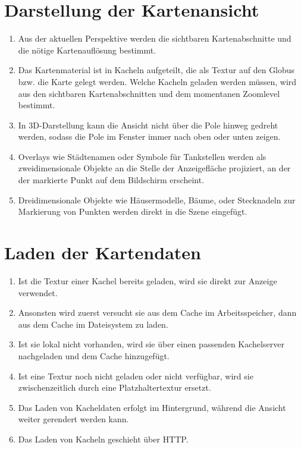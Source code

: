 \documentclass[10pt]{scrreprt}
\begin{document}
\section{Darstellung der Kartenansicht}
\begin{enumerate}[leftmargin=2cm]
\item Aus der aktuellen Perspektive werden die sichtbaren Kartenabschnitte und die nötige Kartenauflösung bestimmt.
\item Das Kartenmaterial ist in Kacheln aufgeteilt, die als Textur auf den Globus bzw. die Karte gelegt werden. Welche Kacheln geladen werden müssen, wird  aus den sichtbaren Kartenabschnitten und dem momentanen Zoomlevel bestimmt.
\item In 3D-Darstellung kann die Ansicht nicht über die Pole hinweg gedreht werden, sodass die Pole im Fenster immer nach oben oder unten zeigen.
\item Overlays wie Städtenamen oder Symbole für Tankstellen werden als zweidimensionale Objekte an die Stelle der Anzeigefläche projiziert, an der der markierte Punkt auf dem Bildschirm erscheint.
\item Dreidimensionale Objekte wie Häusermodelle, Bäume, oder Stecknadeln zur Markierung von Punkten werden direkt in die Szene eingefügt.
\end{enumerate}

\section{Laden der Kartendaten}
\begin{enumerate}[resume,leftmargin=2cm]
\item Ist die Textur einer Kachel bereits geladen, wird sie direkt zur Anzeige verwendet.
\item Ansonsten wird zuerst versucht sie aus dem Cache im Arbeitsspeicher, dann aus dem Cache im Dateisystem zu laden.
\item Ist sie lokal nicht vorhanden, wird sie über einen passenden Kachelserver nachgeladen und dem Cache hinzugefügt.
\item Ist eine Textur noch nicht geladen oder nicht verfügbar, wird sie zwischenzeitlich durch eine Platzhaltertextur ersetzt.
\item Das Laden von Kacheldaten erfolgt im Hintergrund, während die Ansicht weiter gerendert werden kann.
\item Das Laden von Kacheln geschieht über HTTP.
\end{enumerate}
\end{document}
